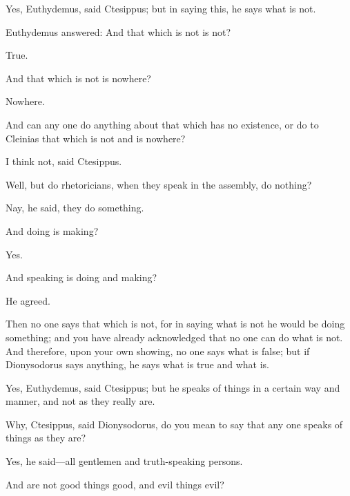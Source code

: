 \documentclass[11pt,letter]{article}
\begin{document}
\par  Yes, Euthydemus, said Ctesippus; but in saying this, he says what is not.

\par  Euthydemus answered: And that which is not is not?

\par  True.

\par  And that which is not is nowhere?

\par  Nowhere.

\par  And can any one do anything about that which has no existence, or do to Cleinias that which is not and is nowhere?

\par  I think not, said Ctesippus.

\par  Well, but do rhetoricians, when they speak in the assembly, do nothing?

\par  Nay, he said, they do something.

\par  And doing is making?

\par  Yes.

\par  And speaking is doing and making?

\par  He agreed.

\par  Then no one says that which is not, for in saying what is not he would be doing something; and you have already acknowledged that no one can do what is not. And therefore, upon your own showing, no one says what is false; but if Dionysodorus says anything, he says what is true and what is.

\par  Yes, Euthydemus, said Ctesippus; but he speaks of things in a certain way and manner, and not as they really are.

\par  Why, Ctesippus, said Dionysodorus, do you mean to say that any one speaks of things as they are?

\par  Yes, he said—all gentlemen and truth-speaking persons.

\par  And are not good things good, and evil things evil?
\end{document}
